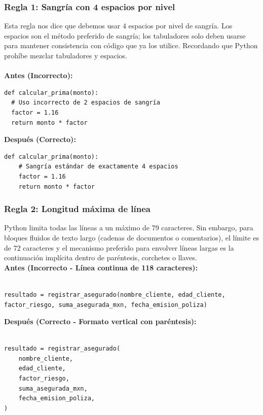 \documentclass{article}
\begin{document}
		\subsubsection*{Regla 1: Sangría con 4 espacios por nivel}
    	Esta regla nos dice que debemos usar 4 espacios por nivel de sangría. Los espacios son el método preferido de sangría;
		los tabuladores solo deben usarse para mantener consistencia con código que ya los utilice. Recordando que Python prohíbe mezclar 
		tabuladores y espacios.\\ \\
    
    	\textbf{Antes (Incorrecto):}

	    \begin{verbatim}
def calcular_prima(monto):
  # Uso incorrecto de 2 espacios de sangría
  factor = 1.16
  return monto * factor
	    \end{verbatim}
    
    	\textbf{Después (Correcto):}
    	\begin{verbatim}
def calcular_prima(monto):
    # Sangría estándar de exactamente 4 espacios
    factor = 1.16
    return monto * factor
    	\end{verbatim}

		\subsubsection*{Regla 2: Longitud máxima de línea}
   		 Python limita todas las líneas a un máximo de 79 caracteres. Sin embargo, para bloques fluidos de texto largo
		  (cadenas de documentos o comentarios), el límite es de 72 caracteres y el mecanismo preferido para envolver líneas largas
		   es la continuación implícita dentro de paréntesis, corchetes o llaves.\\
    
    	\textbf{Antes (Incorrecto - Línea continua de 118 caracteres):}
    	\begin{verbatim}

resultado = registrar_asegurado(nombre_cliente, edad_cliente, factor_riesgo, suma_asegurada_mxn, fecha_emision_poliza)

    	\end{verbatim}
    
    	\textbf{Después (Correcto - Formato vertical con paréntesis):}
    	\begin{verbatim}

resultado = registrar_asegurado(
    nombre_cliente,
    edad_cliente,
    factor_riesgo,
    suma_asegurada_mxn,
    fecha_emision_poliza,
)
    	\end{verbatim}
	\newpage
\end{document}

